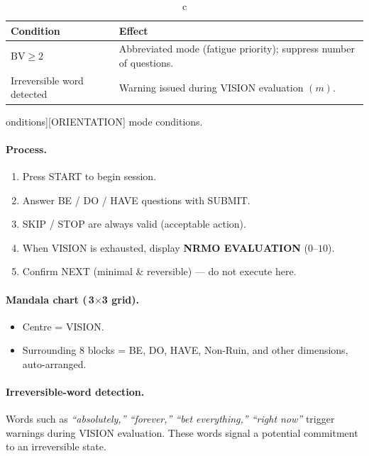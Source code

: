 \begin{table}[ht]
\centering
\small
\begin{tabularx}{0.95\linewidth}{lX}
\toprule
\textbf{Condition} & \textbf{Effect} \\
\midrule
$\mathrm{BV} \ge 2$ & Abbreviated mode (fatigue priority); suppress
number of questions. \\
Irreversible word detected & Warning issued during VISION evaluation
$(m)$. \\
\bottomrule
\end{tabularx}
\caption[\,[ORIENTATION] conditions]{[ORIENTATION] mode conditions.}
\label{tab:orientation-conditions}
\end{table}

\paragraph{Process.}

\begin{enumerate}
\item Press START to begin session.
\item Answer BE / DO / HAVE questions with SUBMIT.
\item SKIP / STOP are always valid (acceptable action).
\item When VISION is exhausted, display \textbf{NRMO EVALUATION}
($0$--$10$).
\item Confirm NEXT (minimal \& reversible) --- do not execute here.
\end{enumerate}

\paragraph{Mandala chart (\,3$\times$3 grid).}

\begin{itemize}
\item Centre = VISION.
\item Surrounding 8 blocks = BE, DO, HAVE, Non-Ruin, and other
dimensions, auto-arranged.
\end{itemize}

\paragraph{Irreversible-word detection.}
Words such as \textit{``absolutely,'' ``forever,'' ``bet
everything,'' ``right now''} trigger warnings during VISION
evaluation. These words signal a potential commitment to an
irreversible state.
